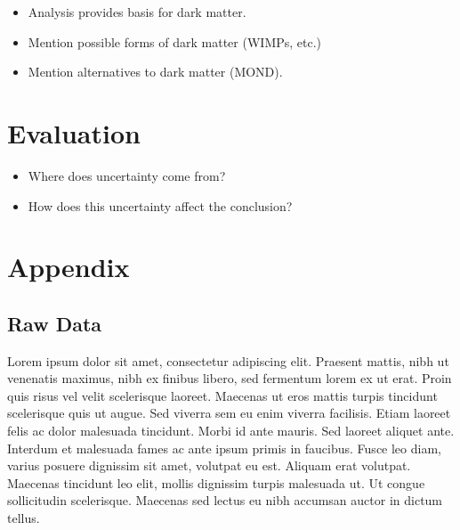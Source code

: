 \documentclass{article}
\begin{document}
\begin{itemize}
    \item Analysis provides basis for dark matter.
    \item Mention possible forms of dark matter (WIMPs, etc.)
    \item Mention alternatives to dark matter (MOND).
\end{itemize}

\section{Evaluation}\label{sec:evaluation}

\begin{itemize}
    \item Where does uncertainty come from?
    \item How does this uncertainty affect the conclusion?
\end{itemize}

\appendix

\section{Appendix}

\subsection{Raw Data}

Lorem ipsum dolor sit amet, consectetur adipiscing elit. Praesent mattis, nibh ut venenatis maximus, nibh ex finibus libero, sed fermentum lorem ex ut erat. Proin quis risus vel velit scelerisque laoreet. Maecenas ut eros mattis turpis tincidunt scelerisque quis ut augue. Sed viverra sem eu enim viverra facilisis. Etiam laoreet felis ac dolor malesuada tincidunt. Morbi id ante mauris. Sed laoreet aliquet ante. Interdum et malesuada fames ac ante ipsum primis in faucibus. Fusce leo diam, varius posuere dignissim sit amet, volutpat eu est. Aliquam erat volutpat. Maecenas tincidunt leo elit, mollis dignissim turpis malesuada ut. Ut congue sollicitudin scelerisque. Maecenas sed lectus eu nibh accumsan auctor in dictum tellus.

\end{document}
